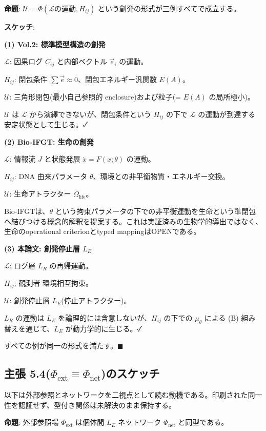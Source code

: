 \textbf{命題}: $\mathcal{U} = \Phi(\mathcal{L}\text{の運動}, H_{ij})$ という創発の形式が三例すべてで成立する。

\textbf{スケッチ}:

\textbf{(1) Vol.2: 標準模型構造の創発}

$\mathcal{L}$: 因果ログ $C_{ij}$ と内部ベクトル $\vec{e}_i$ の運動。

$H_{ij}$: 閉包条件 $\sum \vec{e} \approx 0$、閉包エネルギー汎関数 $E(A)$。

$\mathcal{U}$: 三角形閉包(最小自己参照的 enclosure)および粒子(= $E(A)$ の局所極小)。

$\mathcal{U}$ は $\mathcal{L}$ から演繹できないが、閉包条件という $H_{ij}$ の下で $\mathcal{L}$ の運動が到達する安定状態として生じる。✓

\textbf{(2) Bio-IFGT: 生命の創発}

$\mathcal{L}$: 情報流 $J$ と状態発展 $\dot{x} = F(x;\theta)$ の運動。

$H_{ij}$: DNA 由来パラメータ $\theta$、環境との非平衡物質・エネルギー交換。

$\mathcal{U}$: 生命アトラクター $\Omega_{\text{life}}$。

Bio-IFGTは、$\theta$ という拘束パラメータの下での非平衡運動を生命という準閉包へ結びつける概念的解釈を提案する。これは実証済みの生物学的導出ではなく、生命のoperational criterionとtyped mappingはOPENである。

\textbf{(3) 本論文: 創発停止層 $L_E$}

$\mathcal{L}$: ログ層 $L_R$ の再帰運動。

$H_{ij}$: 観測者-環境相互拘束。

$\mathcal{U}$: 創発停止層 $L_E$(停止アトラクター)。

$L_R$ の運動は $L_E$ を論理的には含意しないが、$H_{ij}$ の下での $\mu_\theta$ による (B) 組み替えを通じて、$L_E$ が動力学的に生じる。✓

すべての例が同一の形式を満たす。$\blacksquare$

\bigskip


\subsection{主張 5.4($\Phi_{\text{ext}} \equiv \Phi_{\text{net}}$)のスケッチ}

以下は外部参照とネットワークを二視点として読む動機である。印刷された同一性を認証せず、型付き関係は未解決のまま保持する。


\textbf{命題}: 外部参照場 $\Phi_{\text{ext}}$ は個体間 $L_E$ ネットワーク $\Phi_{\text{net}}$ と同型である。

